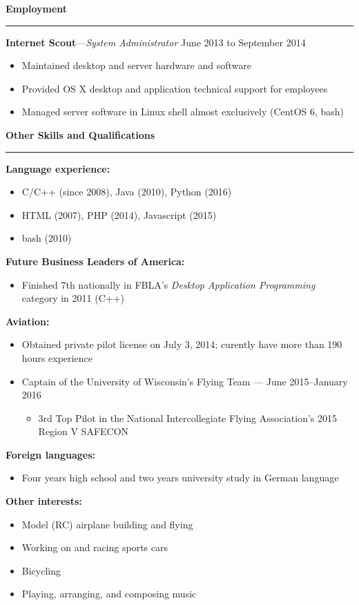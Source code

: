 \documentclass[12pt,letterpaper]{article}
\newenvironment{details}{
    \vspace{-.8em}
    \begin{itemize}
        \renewcommand \labelitemi{\labelitemiv}
        \setlength{\itemsep}{0pt}
        \setlength{\parskip}{-1pt}
        \setlength{\parsep}{0pt}
    }{
    \end{itemize}
    \vspace{-.5em}
}
\newcommand{\hr} {
    \vspace{-1em}
    \par\rule{\textwidth}{1pt}
    \vspace{-1.5em}
}
\newcommand{\ressection}[1] {
    \par{\large \textbf{#1}}
    \hr
}
\newenvironment{employment} {
    \setlength{\parskip}{0pt}
    \ressection{Employment}
}{
    \vspace{0.5em}
}
\newenvironment{other} {
    \ressection{Other Skills and Qualifications}
    \setlength{\parskip}{3pt}
}{
    \vspace{0.5em}
}
\newcommand{\employer}[3] {
    \vspace{3pt}
    {\par\textbf{#1}---\textit{#2} \hfill #3}
    \par
}
\begin{document}
\begin{employment}
\employer{Internet Scout}{System Administrator}{June 2013 to September 2014}
\begin{details}
    \item Maintained desktop and server hardware and software
    \item Provided OS X desktop and application technical support for employees
    \item Managed server software in Linux shell almost exclusively (CentOS 6, bash)
\end{details}

\end{employment}

\begin{other}
\par \textbf{Language experience:}
\begin{details}
    \item C/C++ (since 2008), Java (2010), Python (2016)
    \item HTML (2007), PHP (2014), Javascript (2015)
    \item bash (2010)
\end{details}
\par \textbf{Future Business Leaders of America:}
\begin{details}
    \item Finished 7th nationally in FBLA's \textit{Desktop Application Programming} category in 2011 (C++)
\end{details}

\par \textbf{Aviation:}
\begin{details}
    \item Obtained private pilot license on July 3, 2014; curently have more than 190 hours experience
    \item Captain of the University of Wisconsin's Flying Team --- June 2015--January 2016
    \vspace{.5em}
    \begin{details}
        \item 3rd Top Pilot in the National Intercollegiate Flying Association's 2015 Region V SAFECON
    \end{details}
\end{details}

\par \textbf{Foreign languages:}
\begin{details}
    \item Four years high school and two years university study in German language
\end{details}

\par \textbf{Other interests:}
\begin{details}
    \item Model (RC) airplane building and flying
    \item Working on and racing sports cars
    \item Bicycling
    \item Playing, arranging, and composing music
\end{details}

\end{other}
\end{document}
